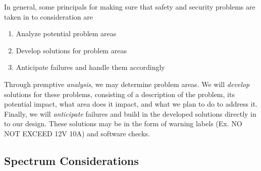 In general, some principals for making sure that safety and security problems
are taken in to consideration are

\begin{enumerate} \item Analyze potential problem areas \item Develop solutions
for problem areas \item Anticipate failures and handle them accordingly
\end{enumerate}

Through premptive \emph{analysis}, we may determine problem areas. We will
\emph{develop} solutions for these problems, consisting of a description of the
problem, its potential impact, what area does it impact, and what we plan to do
to address it. Finally, we will \emph{anticipate} failures and build in the
developed solutions directly in to our design. These solutions may be in the
form of warning labels (Ex. NO NOT EXCEED 12V 10A) and software checks.

\subsection{Spectrum Considerations}

